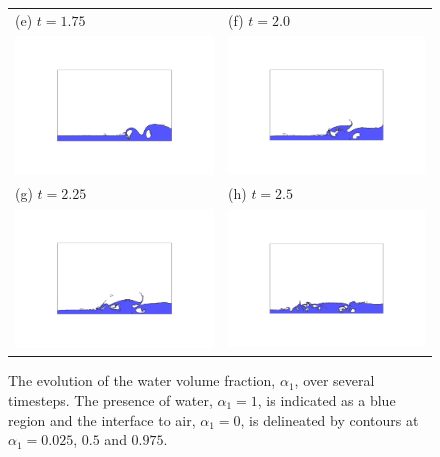 \begin{figure}[tbp]
\begin{center}
\begin{tabular}{ll}
(e) $t = 1.75$ & (f) $t = 2.0$ \\
\includegraphics[width=7cm, trim=8.0cm 6.5cm 8.0cm 6.5cm, clip=true]{examples_images/water_collapse/water_collapse_350.png} & \includegraphics[width=7cm, trim=8.0cm 6.5cm 8.0cm 6.5cm, clip=true]{examples_images/water_collapse/water_collapse_400.png} \\
(g) $t = 2.25$ & (h) $t = 2.5$ \\
\includegraphics[width=7cm, trim=8.0cm 6.5cm 8.0cm 6.5cm, clip=true]{examples_images/water_collapse/water_collapse_450.png} & \includegraphics[width=7cm, trim=8.0cm 6.5cm 8.0cm 6.5cm, clip=true]{examples_images/water_collapse/water_collapse_500.png} \\
\end{tabular}
\caption{The evolution of the water volume fraction, $\alpha_1$, over several timesteps.  The presence of water, $\alpha_1=1$, is indicated as a blue region and the interface to air, $\alpha_1=0$, is delineated by contours at $\alpha_1 = 0.025$, $0.5$ and $0.975$.}
\label{fig:zhouwholea}
\end{center}
\end{figure}

